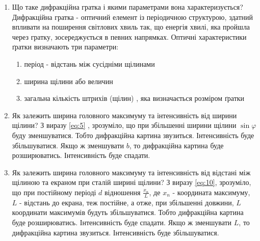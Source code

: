 \begin{enumerate}
    \item Що таке дифракційна гратка і якими параметрами вона характеризується?
    \bigbreak
    Дифракційна гратка - оптичний елемент із періодичною 
    структурою, здатний впливати на поширення світлових хвиль так,
    що енергія хвилі, яка пройшла через гратку, зосереджується 
    в певних напрямках.  Оптичні характеристики ґратки визначають три параметри:
    \begin{enumerate}
        \item період - відстань між сусідніми щілинами
        \item ширина щілини або величин
        \item загальна кількість штрихів (щілин) , яка визначається розміром ґратки
    \end{enumerate}    


    \item Як залежить ширина головного максимуму та інтенсивність від ширини щілини?
    \bigbreak
    З виразу  \ref{eq:5} , зрозуміло, що при збільшенні
    ширини щілини $\sin \varphi$ буду зменшуватися. Тобто дифракційна
    картина звузиться. Інтенсивність буде збільшуватися.
    Якщо ж зменшувати $b$, то дифракційна 
    картина буде розширюватись. Інтенсивність буде спадати.

    \item Як залежить ширина головного максимуму та інтенсивність від відстані між щілиною та екраном при сталій ширині щілини?
    \bigbreak
    З виразу  \ref{eq:10}, зрозуміло, що при постійному періоді $d$
    відношення $\frac{x_n}{L}$, де $x_n$ - координата максимуму,
    $L$ - відстань до екрана, теж постійне, а отже, при збільшенні довжини,
    $L$ координати максимумів будуть збільшуватися. Тобто    
    дифракційна картина буде розширюватись. 
    Інтенсивність буде спадати.
    Якщо ж зменшувати $L$, то дифракційна картина звузиться.
    Інтенсивність буде збільшуватися.

    
\end{enumerate}